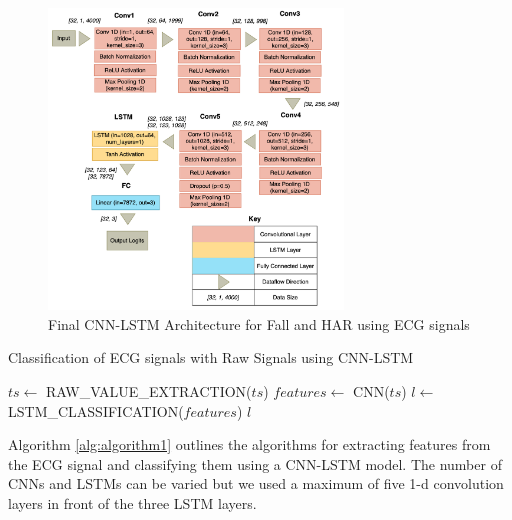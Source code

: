\documentclass{ieeeaccess}
\begin{document}
\begin{figure}[ht]
\centerline{\includegraphics[width=18.5pc]{Definitions/final-cnnlstm-arch.png}}
\caption{Final CNN-LSTM Architecture for Fall and HAR using ECG signals}
\label{fig:cnnlstmArchitecture}
\end{figure}  




\begin{algorithm}
 \caption{Classification of ECG signals with Raw Signals using CNN-LSTM}
  \label{alg:algorithm1}
 \begin{algorithmic}[1]
 \renewcommand{\algorithmicrequire}{\textbf{Input:} A time series ECG raw data $ts$}
 \renewcommand{\algorithmicensure}{\textbf{Output:} The classified label $l$}
 \REQUIRE 
 \ENSURE  

\STATE $ts \leftarrow$  RAW\_VALUE\_EXTRACTION($ts$)
\STATE $features \leftarrow$ CNN($ts$)
\STATE $l \leftarrow$ LSTM\_CLASSIFICATION($features$)
 \RETURN $l$
\end{algorithmic}
\end{algorithm}
Algorithm \ref{alg:algorithm1} outlines the algorithms for extracting features from the ECG signal and classifying them using a CNN-LSTM model. The number of CNNs and LSTMs can be varied but we used a maximum of five 1-d convolution layers in front of the three LSTM layers.
\end{document}
